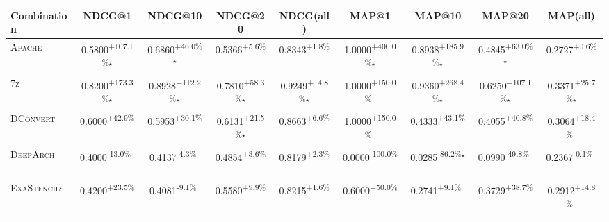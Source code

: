 \begin{table}[htbp]
\centering
\renewcommand{\arraystretch}{1.2}
\begin{tabular}{l|cccc|cccc}
\hline
Combination & NDCG@1 & NDCG@10 & NDCG@20 & NDCG(all) & MAP@1 & MAP@10 & MAP@20 & MAP(all) \\ \hline
\textsc{Apache} & \cellcolor{green!30}0.5800\textsuperscript{+107.1\%}$^\star$ & \cellcolor{green!30}0.6860\textsuperscript{+46.0\%}$^\star$ & \cellcolor{green!30}0.5366\textsuperscript{+5.6\%}$^{\,\,\,}$ & \cellcolor{green!30}0.8343\textsuperscript{+1.8\%}$^{\,\,\,}$ & \cellcolor{green!30}1.0000\textsuperscript{+400.0\%}$^\star$ & \cellcolor{green!30}0.8938\textsuperscript{+185.9\%}$^\star$ & \cellcolor{green!30}0.4845\textsuperscript{+63.0\%}$^\star$ & \cellcolor{green!30}0.2727\textsuperscript{+0.6\%}$^{\,\,\,}$ \\
\textsc{7z} & \cellcolor{green!30}0.8200\textsuperscript{+173.3\%}$^\star$ & \cellcolor{green!30}0.8928\textsuperscript{+112.2\%}$^\star$ & \cellcolor{green!30}0.7810\textsuperscript{+58.3\%}$^\star$ & \cellcolor{green!30}0.9249\textsuperscript{+14.8\%}$^\star$ & \cellcolor{green!30}1.0000\textsuperscript{+150.0\%}$^{\,\,\,}$ & \cellcolor{green!30}0.9360\textsuperscript{+268.4\%}$^\star$ & \cellcolor{green!30}0.6250\textsuperscript{+107.1\%}$^\star$ & \cellcolor{green!30}0.3371\textsuperscript{+25.7\%}$^\star$ \\
\textsc{DConvert} & \cellcolor{green!30}0.6000\textsuperscript{+42.9\%}$^{\,\,\,}$ & \cellcolor{green!30}0.5953\textsuperscript{+30.1\%}$^{\,\,\,}$ & \cellcolor{green!30}0.6131\textsuperscript{+21.5\%}$^\star$ & \cellcolor{green!30}0.8663\textsuperscript{+6.6\%}$^{\,\,\,}$ & \cellcolor{green!30}1.0000\textsuperscript{+150.0\%}$^{\,\,\,}$ & \cellcolor{green!30}0.4333\textsuperscript{+43.1\%}$^{\,\,\,}$ & \cellcolor{green!30}0.4055\textsuperscript{+40.8\%}$^{\,\,\,}$ & \cellcolor{green!30}0.3064\textsuperscript{+18.4\%}$^{\,\,\,}$ \\
\textsc{DeepArch} & \cellcolor{red!30}0.4000\textsuperscript{-13.0\%}$^{\,\,\,}$ & \cellcolor{red!30}0.4137\textsuperscript{-4.3\%}$^{\,\,\,}$ & \cellcolor{green!30}0.4854\textsuperscript{+3.6\%}$^{\,\,\,}$ & \cellcolor{green!30}0.8179\textsuperscript{+2.3\%}$^{\,\,\,}$ & \cellcolor{red!30}0.0000\textsuperscript{-100.0\%}$^{\,\,\,}$ & \cellcolor{red!30}0.0285\textsuperscript{-86.2\%}$^\star$ & \cellcolor{red!30}0.0990\textsuperscript{-49.8\%}$^{\,\,\,}$ & \cellcolor{red!30}0.2367\textsuperscript{-0.1\%}$^{\,\,\,}$ \\
\textsc{ExaStencils} & \cellcolor{green!30}0.4200\textsuperscript{+23.5\%}$^{\,\,\,}$ & \cellcolor{red!30}0.4081\textsuperscript{-9.1\%}$^{\,\,\,}$ & \cellcolor{green!30}0.5580\textsuperscript{+9.9\%}$^{\,\,\,}$ & \cellcolor{green!30}0.8215\textsuperscript{+1.6\%}$^{\,\,\,}$ & \cellcolor{green!30}0.6000\textsuperscript{+50.0\%}$^{\,\,\,}$ & \cellcolor{green!30}0.2741\textsuperscript{+9.1\%}$^{\,\,\,}$ & \cellcolor{green!30}0.3729\textsuperscript{+38.7\%}$^{\,\,\,}$ & \cellcolor{green!30}0.2912\textsuperscript{+14.8\%}$^{\,\,\,}$ \\

\end{tabular}
\end{table}
